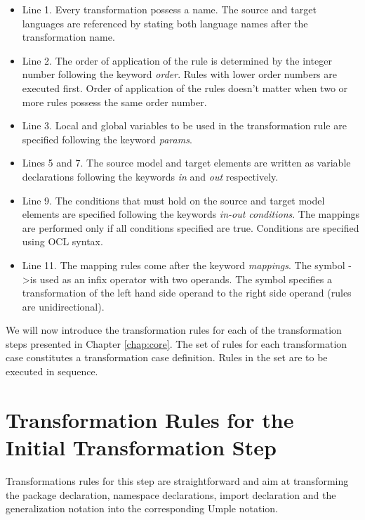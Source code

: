 \begin{itemize}

\item Line 1. Every transformation possess a name. The source and target languages are referenced by stating both language names after the transformation name.

\item Line 2. The order of application of the rule is determined by the integer number following the keyword \textit{order}. Rules with lower order numbers are executed first. Order of application of the rules doesn't matter when two or more rules possess the same order number. 

\item Line 3. Local and global variables to be used in the transformation rule are specified following the keyword \textit{params}.

\item Lines 5 and 7. The source model and target elements are written as variable declarations following the keywords \textit{in} and \textit{out} respectively.

\item Line 9. The conditions that must hold on the source and target model elements are specified following the keywords \textit{in-out conditions}. The mappings are performed only if all conditions specified are true. Conditions are specified using OCL syntax. 

\item Line 11. The mapping rules come after the keyword \textit{mappings}. The symbol -\textgreater  is used as an infix operator with two operands. The symbol specifies a transformation of the left hand side operand to the right side operand (rules are unidirectional).
\end{itemize}

We will now introduce the transformation rules for each of the transformation steps presented in Chapter \ref{chap:core}.
The set of rules for each transformation case constitutes a transformation case definition. Rules in the set are to be executed in sequence.

\section{Transformation Rules for the Initial Transformation Step}

Transformations rules for this step are straightforward and aim at transforming the package declaration, namespace declarations, import declaration and the generalization notation into the corresponding Umple notation. 

